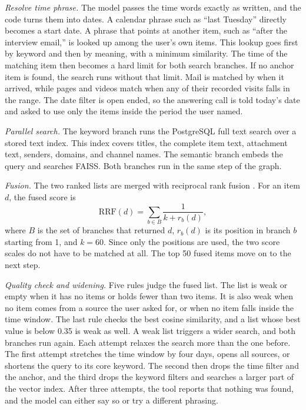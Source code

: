 \documentclass[conference]{IEEEtran}
\begin{document}
\textit{Resolve time phrase.} The model passes the time words exactly as written, and the code turns them into dates. A calendar phrase such as ``last Tuesday'' directly becomes a start date. A phrase that points at another item, such as ``after the interview email,'' is looked up among the user's own items. This lookup goes first by keyword and then by meaning, with a minimum similarity. The time of the matching item then becomes a hard limit for both search branches. If no anchor item is found, the search runs without that limit. Mail is matched by when it arrived, while pages and videos match when any of their recorded visits falls in the range. The date filter is open ended, so the answering call is told today's date and asked to use only the items inside the period the user named.

\textit{Parallel search.} The keyword branch runs the PostgreSQL full text search over a stored text index. This index covers titles, the complete item text, attachment text, senders, domains, and channel names. The semantic branch embeds the query and searches FAISS. Both branches run in the same step of the graph.

\textit{Fusion.} The two ranked lists are merged with reciprocal rank fusion \cite{b9}. For an item $d$, the fused score is
\begin{equation}
\mathrm{RRF}(d) = \sum_{b \in B} \frac{1}{k + r_b(d)}, \label{eq:rrf}
\end{equation}
where $B$ is the set of branches that returned $d$, $r_b(d)$ is its position in branch $b$ starting from 1, and $k = 60$. Since only the positions are used, the two score scales do not have to be matched at all. The top 50 fused items move on to the next step.

\textit{Quality check and widening.} Five rules judge the fused list. The list is weak or empty when it has no items or holds fewer than two items. It is also weak when no item comes from a source the user asked for, or when no item falls inside the time window. The last rule checks the best cosine similarity, and a list whose best value is below 0.35 is weak as well. A weak list triggers a wider search, and both branches run again. Each attempt relaxes the search more than the one before. The first attempt stretches the time window by four days, opens all sources, or shortens the query to its core keyword. The second then drops the time filter and the anchor, and the third drops the keyword filters and searches a larger part of the vector index. After three attempts, the tool reports that nothing was found, and the model can either say so or try a different phrasing.
\end{document}

